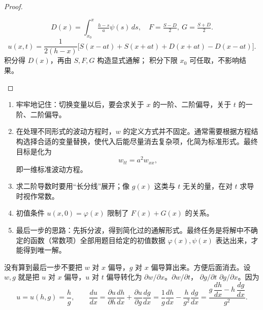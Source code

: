 \begin{proof}
\begin{tcolorbox}[enhanced, breakable, sidebyside, lefthand ratio=0.65,
colback=white, colframe=gray!40, sharp corners]
\[
D(x)=\int_{x_0}^x \tfrac{h-s}{a}\psi(s)\,ds,
\quad
F=\tfrac{S-D}{2},\ G=\tfrac{S+D}{2}.
\]
\[
\boxed{
u(x,t)=\frac{1}{2(h-x)}
\big[S(x-at)+S(x+at)+D(x+at)-D(x-at)\big].
}
\]
\tcblower
\textcolor{second}{积分得 $D(x)$，再由 $S,F,G$ 构造显式通解；
积分下限 $x_0$ 可任取，不影响结果。}
\end{tcolorbox}

\end{proof}
\begin{dxtips}[计算技巧]
\begin{enumerate}
  \item 牢牢地记住：切换变量以后，要会求关于 $x$ 的一阶、二阶偏导，关于 $t$ 的一阶、二阶偏导。
 
  \item 在处理不同形式的波动方程时，$w$ 的定义方式并不固定。通常需要根据方程结构选择合适的变量替换，使代入后能尽量消去复杂项，化简为标准形式。最终目标是化为
  \[
  w_{tt}=a^{2}w_{xx},
  \]
  即一维标准波动方程。
  
  \item 求二阶导数时要用“长分线”展开；像 $g(x)$ 这类与 $t$ 无关的量，在对 $t$ 求导时视作常数。
  
  \item 初值条件 $u(x,0)=\varphi(x)$ 限制了 $F(x)+G(x)$ 的关系。
  
  \item 最后一步的思路：先拆分波，得到简化过的通解形式。最终任务是将解中不确定的函数（常数项）全部用题目给定的初值数据 $\varphi(x),\psi(x)$ 表达出来，才能得到唯一解。
\end{enumerate}
\end{dxtips}
\begin{dxtips}[关于偏导的处理与原理u=(h,g)是重点]
没有算到最后一步不要把 $w$ 对 $x$ 偏导，$g$ 对 $x$ 偏导算出来。方便后面消去。设 $w,g$ 就是把 $u$ 对 $x$ 偏导，$u$ 对 $t$ 偏导转化为 $\partial w/\partial x$。$\partial w/\partial t$，
$\partial g/\partial t$
$\partial g/\partial x$。因为
\[
u = u(h,g)=\frac{h}{g},\qquad
\frac{du}{dx}
=\frac{\partial u}{\partial h}\frac{dh}{dx}
+\frac{\partial u}{\partial g}\frac{dg}{dx}
=\frac{1}{g}\frac{dh}{dx}
-\frac{h}{g^2}\frac{dg}{dx}
=\frac{g\,\dfrac{dh}{dx}-h\,\dfrac{dg}{dx}}{g^2}.
\]
\end{dxtips}
